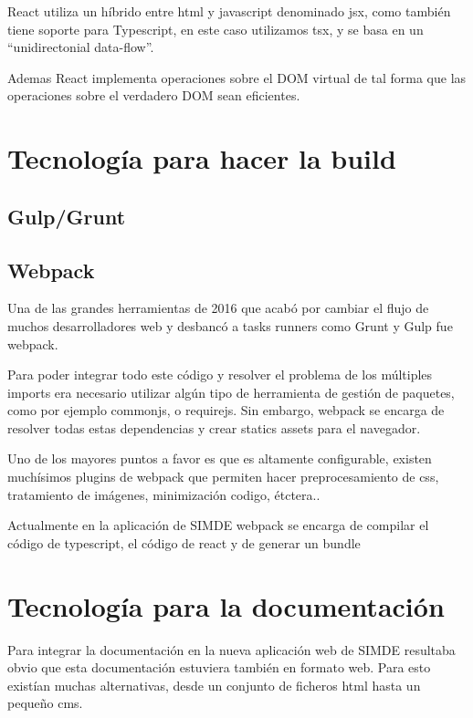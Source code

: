 \bigskip
React utiliza un híbrido entre html y javascript denominado jsx, como también tiene soporte para 
Typescript, en este caso utilizamos tsx, y se basa en un “unidirectonial data-flow”. 

\bigskip
Ademas React implementa operaciones sobre el DOM virtual de tal forma que las operaciones sobre
el verdadero DOM sean eficientes.

\section{Tecnología para hacer la build}
\label{3:sec3}

\subsection{Gulp/Grunt}

\subsection{Webpack}
\bigskip
Una de las grandes herramientas de 2016 que acabó por cambiar el flujo de muchos 
desarrolladores web y desbancó a tasks runners como Grunt y Gulp fue webpack.

\bigskip
Para poder integrar todo este código y resolver el problema de los múltiples imports 
era necesario utilizar algún tipo de herramienta de gestión de paquetes, como por ejemplo 
commonjs, o requirejs. Sin embargo, webpack se encarga de resolver todas estas 
dependencias y crear statics assets para el navegador.

\bigskip
Uno de los mayores puntos a favor es que es altamente configurable, existen muchísimos 
plugins de webpack que permiten hacer preprocesamiento de css, tratamiento de imágenes,
minimización codigo, étctera.. 

\bigskip
Actualmente en la aplicación de SIMDE webpack  se encarga de compilar el código de 
typescript, el código de react y de generar un bundle 

\section{Tecnología para la documentación}
\label{3:sec4}

Para integrar la documentación en la nueva aplicación web de SIMDE resultaba obvio que esta documentación
estuviera también en formato web. Para esto existían muchas alternativas, desde un conjunto de ficheros
html hasta un pequeño cms. 

